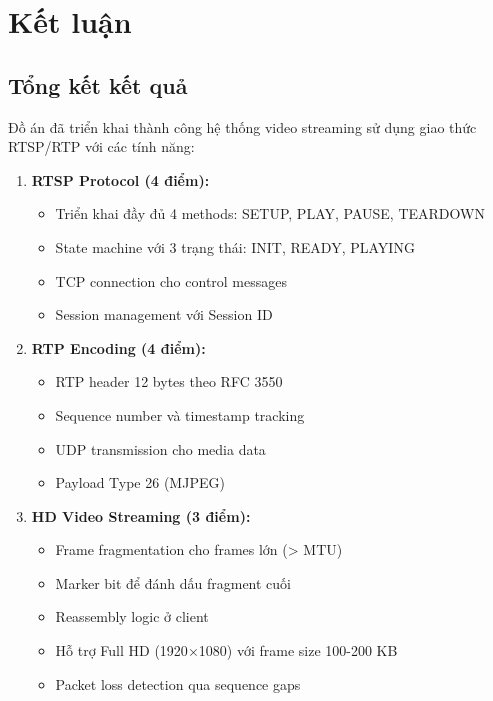 
\section{Kết luận}

\subsection{Tổng kết kết quả}

Đồ án đã triển khai thành công hệ thống video streaming sử dụng giao thức RTSP/RTP với các tính năng:

\begin{enumerate}
    \item \textbf{RTSP Protocol (4 điểm):}
    \begin{itemize}
        \item Triển khai đầy đủ 4 methods: SETUP, PLAY, PAUSE, TEARDOWN
        \item State machine với 3 trạng thái: INIT, READY, PLAYING
        \item TCP connection cho control messages
        \item Session management với Session ID
    \end{itemize}
    
    \item \textbf{RTP Encoding (4 điểm):}
    \begin{itemize}
        \item RTP header 12 bytes theo RFC 3550
        \item Sequence number và timestamp tracking
        \item UDP transmission cho media data
        \item Payload Type 26 (MJPEG)
    \end{itemize}
    
    \item \textbf{HD Video Streaming (3 điểm):}
    \begin{itemize}
        \item Frame fragmentation cho frames lớn (> MTU)
        \item Marker bit để đánh dấu fragment cuối
        \item Reassembly logic ở client
        \item Hỗ trợ Full HD (1920$\times$1080) với frame size 100-200 KB
        \item Packet loss detection qua sequence gaps
    \end{itemize}
    

\end{enumerate}
